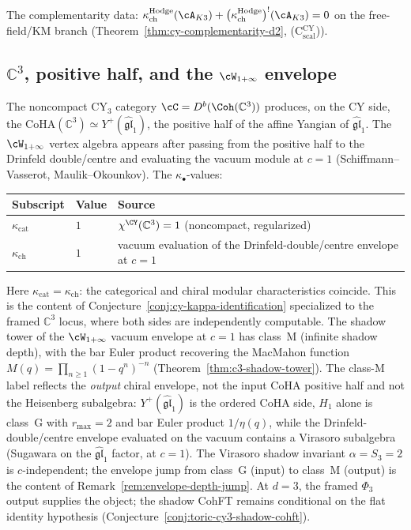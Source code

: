 The complementarity data: $\kappa_{\mathrm{ch}}^{\mathrm{Hodge}}(\cA_{K3}) + \bigl(\kappa_{\mathrm{ch}}^{\mathrm{Hodge}}\bigr)^!(\cA_{K3}) = 0$ on the free-field/KM branch (Theorem~\ref{thm:cy-complementarity-d2}, (C$_{\mathrm{scal}}^{\mathrm{CY}}$)).

\subsection{\texorpdfstring{$\mathbb{C}^3$}{C-3}, positive half, and the \texorpdfstring{$\cW_{1+\infty}$}{W-1+inf} envelope}
\label{subsec:c3-bridge-example}

The noncompact CY$_3$ category $\cC = D^b(\Coh(\mathbb{C}^3))$ produces, on the CY side, the $\mathrm{CoHA}(\mathbb{C}^3) \simeq Y^+(\widehat{\mathfrak{gl}}_1)$, the positive half of the affine Yangian of $\widehat{\mathfrak{gl}}_1$.
The $\cW_{1+\infty}$ vertex algebra appears after passing from the positive half to the Drinfeld double/centre and evaluating the vacuum module at $c = 1$ (Schiffmann--Vasserot, Maulik--Okounkov). The $\kappa_\bullet$-values:

\begin{center}
\begin{tabular}{lll}
 \textbf{Subscript} & \textbf{Value} & \textbf{Source} \\
 \hline
 $\kappa_{\mathrm{cat}}$ & $1$ & $\chi^{\CY}(\mathbb{C}^3) = 1$ (noncompact, regularized) \\
 $\kappa_{\mathrm{ch}}$ & $1$ & vacuum evaluation of the Drinfeld-double/centre envelope at $c=1$ \\
\end{tabular}
\end{center}

Here $\kappa_{\mathrm{cat}} = \kappa_{\mathrm{ch}}$: the categorical and chiral modular characteristics coincide. This is the content of Conjecture~\ref{conj:cy-kappa-identification} specialized to the framed $\mathbb{C}^3$ locus, where both sides are independently computable. The shadow tower of the $\cW_{1+\infty}$ vacuum envelope at $c = 1$ has class~M (infinite shadow depth), with the bar Euler product recovering the MacMahon function $M(q) = \prod_{n \geq 1} (1 - q^n)^{-n}$ (Theorem~\ref{thm:c3-shadow-tower}). The class-M label reflects the \emph{output} chiral envelope, not the input CoHA positive half and not the Heisenberg subalgebra: $Y^+(\widehat{\mathfrak{gl}}_1)$ is the ordered CoHA side, $H_1$ alone is class~G with $r_{\max} = 2$ and bar Euler product $1/\eta(q)$, while the Drinfeld-double/centre envelope evaluated on the vacuum contains a Virasoro subalgebra (Sugawara on the $\widehat{\mathfrak{gl}}_1$ factor, at $c = 1$). The Virasoro shadow invariant $\alpha = S_3 = 2$ is $c$-independent; the envelope jump from class~G (input) to class~M (output) is the content of Remark~\ref{rem:envelope-depth-jump}. At $d = 3$, the framed $\Phi_3$ output supplies the object; the shadow CohFT remains conditional on the flat identity hypothesis (Conjecture~\ref{conj:toric-cy3-shadow-cohft}).

